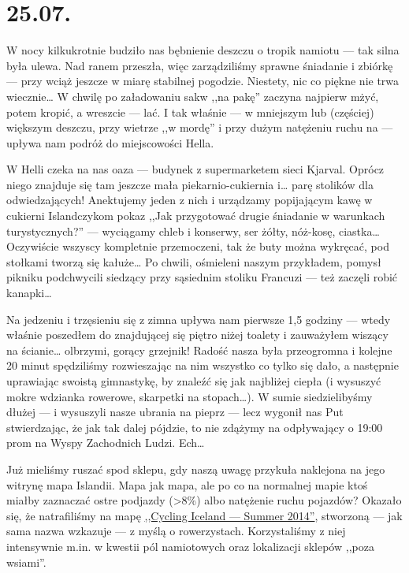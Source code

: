\chapter*{25.07.}

W nocy kilkukrotnie budziło nas bębnienie deszczu o tropik namiotu --- tak silna była ulewa. Nad ranem przeszła, więc zarządziliśmy sprawne śniadanie i zbiórkę --- przy wciąż jeszcze w miarę stabilnej pogodzie. Niestety, nic co piękne nie trwa wiecznie… W chwilę po załadowaniu sakw ,,na pakę'' zaczyna najpierw mżyć, potem kropić, a wreszcie --- lać. I tak właśnie --- w mniejszym lub (częściej) większym deszczu, przy wietrze ,,w mordę'' i przy dużym natężeniu ruchu na  --- upływa nam podróż do miejscowości Hella.

W Helli czeka na nas oaza --- budynek z supermarketem sieci Kjarval. Oprócz niego znajduje się tam jeszcze mała piekarnio-cukiernia i… parę stolików dla odwiedzających! Anektujemy jeden z nich i urządzamy popijającym kawę w cukierni Islandczykom pokaz ,,Jak przygotować drugie śniadanie w warunkach turystycznych?'' --- wyciągamy chleb i konserwy, ser żółty, nóż-kosę, ciastka… Oczywiście wszyscy kompletnie przemoczeni, tak że buty można wykręcać, pod stołkami tworzą się kałuże… Po chwili, ośmieleni naszym przykładem, pomysł pikniku podchwycili siedzący przy sąsiednim stoliku Francuzi --- też zaczęli robić kanapki…

Na jedzeniu i trzęsieniu się z zimna upływa nam pierwsze 1,5 godziny --- wtedy właśnie poszedłem do znajdującej się piętro niżej toalety i zauważyłem wiszący na ścianie… olbrzymi, gorący grzejnik! Radość nasza była przeogromna i kolejne 20 minut spędziliśmy rozwieszając na nim wszystko co tylko się dało, a następnie uprawiając swoistą gimnastykę, by znaleźć się jak najbliżej ciepła (i wysuszyć mokre wdzianka rowerowe, skarpetki na stopach…). W sumie siedzielibyśmy dłużej --- i wysuszyli nasze ubrania na pieprz --- lecz wygonił nas Put stwierdzając, że jak tak dalej pójdzie, to nie zdążymy na odpływający o 19:00 prom na Wyspy Zachodnich Ludzi. Ech…


Już mieliśmy ruszać spod sklepu, gdy naszą uwagę przykuła naklejona na jego witrynę mapa Islandii. Mapa jak mapa, ale po co na normalnej mapie ktoś miałby zaznaczać ostre podjazdy (>8\%) albo natężenie ruchu pojazdów? Okazało się, że natrafiliśmy na mapę \href{http://www.vegagerdin.is/media/upplysingar-og-utgafa/Cycling-map.pdf}{,,Cycling Iceland --- Summer 2014''}, stworzoną --- jak sama nazwa wzkazuje --- z myślą o rowerzystach. Korzystaliśmy z niej intensywnie m.in. w kwestii pól namiotowych oraz lokalizacji sklepów ,,poza wsiami''.

